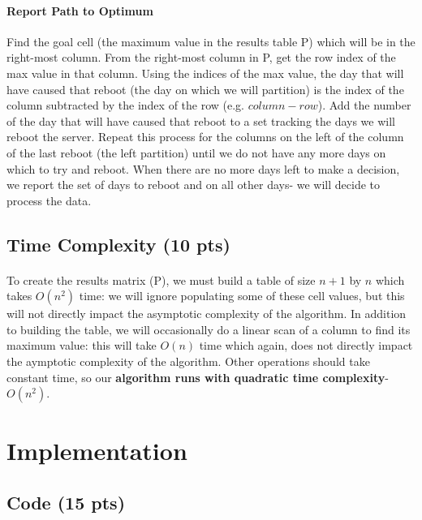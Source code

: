 \documentclass[12pt]{article}
\begin{document}
\paragraph{Report Path to Optimum}
Find the goal cell (the maximum value in the results table P) which will be in the right-most column.
From the right-most column in P, get the row index of the max value in that column.
Using the indices of the max value, the day that will have caused that reboot (the day on which we will partition) is the index of the column subtracted by the index of the row (e.g. $column - row$).
Add the number of the day that will have caused that reboot to a set tracking the days we will reboot the server.
Repeat this process for the columns on the left of the column of the last reboot (the left partition) until we do not have any more days on which to try and reboot.
When there are no more days left to make a decision, we report the set of days to reboot and on all other days- we will decide to process the data.
\subsection{Time Complexity (10 pts)}
\paragraph{}
To create the results matrix (P), we must build a table of size $n + 1$ by $n$ which takes $O(n^2)$ time: we will ignore populating some of these cell values, but this will not directly impact the asymptotic complexity of the algorithm.
In addition to building the table, we will occasionally do a linear scan of a column to find its maximum value: this will take $O(n)$ time which again, does not directly impact the aymptotic complexity of the algorithm. Other operations should take constant time, so our \textbf{algorithm runs with quadratic time complexity}- $O(n^2)$.
\section{Implementation}
\subsection{Code (15 pts)}
\lstset{tabsize=2,
	numbers=left, numberstyle=\tiny,
	frame=single,
	language=Ruby,
	breaklines=true, breakindent=5pt,
	extendedchars=true
}

\end{document}

